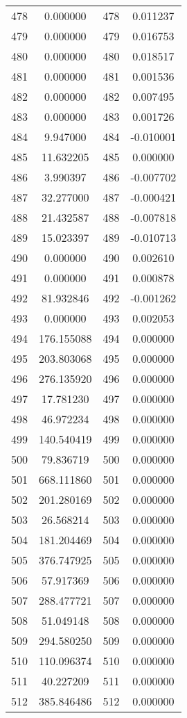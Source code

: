 \documentclass[12pt]{article}
\begin{document}
\begin{longtable}{@{}cccc@{}}
478 & 0.000000 & 478 & 0.011237 \\
479 & 0.000000 & 479 & 0.016753 \\
480 & 0.000000 & 480 & 0.018517 \\
481 & 0.000000 & 481 & 0.001536 \\
482 & 0.000000 & 482 & 0.007495 \\
483 & 0.000000 & 483 & 0.001726 \\
484 & 9.947000 & 484 & -0.010001 \\
485 & 11.632205 & 485 & 0.000000 \\
486 & 3.990397 & 486 & -0.007702 \\
487 & 32.277000 & 487 & -0.000421 \\
488 & 21.432587 & 488 & -0.007818 \\
489 & 15.023397 & 489 & -0.010713 \\
490 & 0.000000 & 490 & 0.002610 \\
491 & 0.000000 & 491 & 0.000878 \\
492 & 81.932846 & 492 & -0.001262 \\
493 & 0.000000 & 493 & 0.002053 \\
494 & 176.155088 & 494 & 0.000000 \\
495 & 203.803068 & 495 & 0.000000 \\
496 & 276.135920 & 496 & 0.000000 \\
497 & 17.781230 & 497 & 0.000000 \\
498 & 46.972234 & 498 & 0.000000 \\
499 & 140.540419 & 499 & 0.000000 \\
500 & 79.836719 & 500 & 0.000000 \\
501 & 668.111860 & 501 & 0.000000 \\
502 & 201.280169 & 502 & 0.000000 \\
503 & 26.568214 & 503 & 0.000000 \\
504 & 181.204469 & 504 & 0.000000 \\
505 & 376.747925 & 505 & 0.000000 \\
506 & 57.917369 & 506 & 0.000000 \\
507 & 288.477721 & 507 & 0.000000 \\
508 & 51.049148 & 508 & 0.000000 \\
509 & 294.580250 & 509 & 0.000000 \\
510 & 110.096374 & 510 & 0.000000 \\
511 & 40.227209 & 511 & 0.000000 \\
512 & 385.846486 & 512 & 0.000000 \\

\end{longtable}
\end{document}
